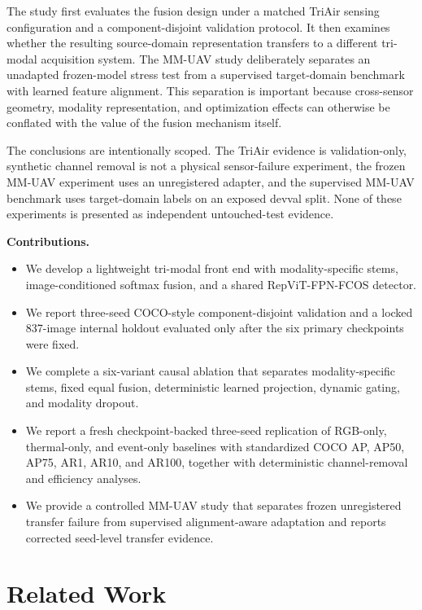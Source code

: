\documentclass[pdflatex,sn-basic,Numbered,iicol]{sn-jnl}
\begin{document}
The study first evaluates the fusion design under a matched TriAir sensing configuration and a component-disjoint validation protocol. It then examines whether the resulting source-domain representation transfers to a different tri-modal acquisition system. The MM-UAV study deliberately separates an unadapted frozen-model stress test from a supervised target-domain benchmark with learned feature alignment. This separation is important because cross-sensor geometry, modality representation, and optimization effects can otherwise be conflated with the value of the fusion mechanism itself.

The conclusions are intentionally scoped. The TriAir evidence is validation-only, synthetic channel removal is not a physical sensor-failure experiment, the frozen MM-UAV experiment uses an unregistered adapter, and the supervised MM-UAV benchmark uses target-domain labels on an exposed devval split. None of these experiments is presented as independent untouched-test evidence.

\noindent\textbf{Contributions.}
\begin{itemize}
    \item We develop a lightweight tri-modal front end with modality-specific stems, image-conditioned softmax fusion, and a shared RepViT-FPN-FCOS detector.
    \item We report three-seed COCO-style component-disjoint validation and a locked 837-image internal holdout evaluated only after the six primary checkpoints were fixed.
    \item We complete a six-variant causal ablation that separates modality-specific stems, fixed equal fusion, deterministic learned projection, dynamic gating, and modality dropout.
    \item We report a fresh checkpoint-backed three-seed replication of RGB-only, thermal-only, and event-only baselines with standardized COCO AP, AP50, AP75, AR1, AR10, and AR100, together with deterministic channel-removal and efficiency analyses.
    \item We provide a controlled MM-UAV study that separates frozen unregistered transfer failure from supervised alignment-aware adaptation and reports corrected seed-level transfer evidence.
\end{itemize}

\section{Related Work}
\end{document}
